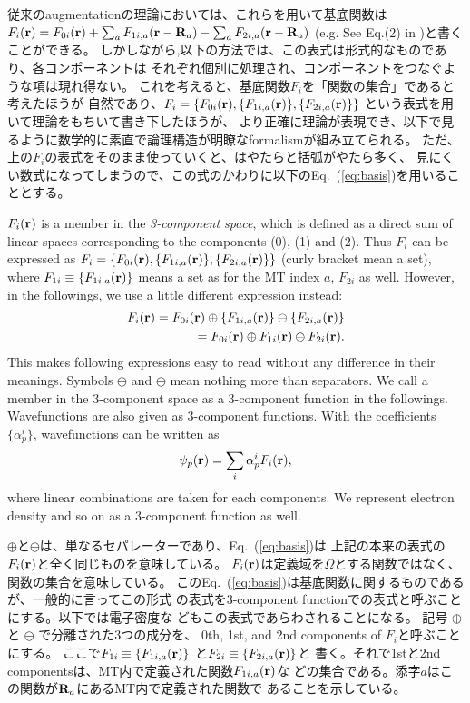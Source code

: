 \documentclass[twocolumn,showpacs,preprintnumbers,amsmath,amssymb,floatfix]{revtex4-1}
\newcommand{\bfr}{{\bf r}}
\newcommand{\bfR}{{\bf R}}
\newcommand{\ooplus}{\oplus}
\newcommand{\oominus}{\ominus}
\newcommand{\req}[1]{\mbox{Eq.~\!(\ref{#1})}}
\begin{document}
従来のaugmentationの理論においては、これらを用いて基底関数は
$F_i(\bfr) = F_{0i}(\bfr)+\sum_a F_{1i,a}(\bfr-\bfR_a)- \sum_a F_{2i,a}(\bfr-\bfR_a)$ 
(e.g. See Eq.(2) in \cite{kresse99})と書くことができる。
しかしながら,以下の方法では、この表式は形式的なものであり、各コンポーネントは
それぞれ個別に処理され、コンポーネントをつなぐような項は現れ得ない。
これを考えると、基底関数$F_i$を「関数の集合」であると考えたほうが
自然であり、$F_i=\{F_{0i}(\bfr),\{F_{1i,a}(\bfr)\},\{F_{2i,a}(\bfr)\} \}$
という表式を用いて理論をもちいて書き下したほうが、
より正確に理論が表現でき、以下で見るように数学的に素直で論理構造が明瞭なformalismが組み立てられる。
ただ、上の$F_i$の表式をそのまま使っていくと、はやたらと括弧がやたら多く、
見にくい数式になってしまうので、この式のかわりに以下の\req{eq:basis}を用いることとする。

$F_{i}(\bfr)$ is a member in the {\it 3-component space}, which
is defined as a direct sum of linear spaces
corresponding to the components (0), (1) and (2). Thus $F_i$ can be expressed as
$F_i=\{F_{0i}(\bfr),\{F_{1i,a}(\bfr)\},\{F_{2i,a}(\bfr)\} \}$
(curly bracket mean a set), where $F_{1i}\equiv \{F_{1i,a}(\bfr)\}$
means a set as for the MT index $a$, $F_{2i}$ as well. However, in the followings, we use a
little different expression instead:
\begin{eqnarray}
F_i(\bfr) = F_{0i}(\bfr) \ooplus \{ F_{1i,a}(\bfr)\} \oominus \{F_{2i,a}(\bfr)\}\nonumber\\
= F_{0i}(\bfr) \ooplus F_{1i}(\bfr)\oominus F_{2i}(\bfr).
\label{eq:basis}
\end{eqnarray}
This makes following expressions easy to read without any difference
in their meanings. Symbols $\ooplus$ and $\oominus$ mean nothing more
than separators.
We call a member in the 3-component space as a 3-component function in
the followings.
Wavefunctions are also given as 3-component functions.
With the coefficients $\{\alpha_{p}^i\}$, wavefunctions can be written as
\begin{eqnarray}
\psi_p(\bfr) = \sum_i \alpha_p^i F_i(\bfr),
\label{eq:eig}
\end{eqnarray}
where linear combinations are taken for each components.
We represent electron density and so on as a 3-component function as well.

$\oplus$と$\ominus$は、単なるセパレーターであり、\req{eq:basis}は
上記の本来の表式の$F_i(\bfr)$と全く同じものを意味している。
$F_i(\bfr)$は定義域を$\Omega$とする関数ではなく、
関数の集合を意味している。
この\req{eq:basis}は基底関数に関するものであるが、一般的に言ってこの形式
の表式を3-component functionでの表式と呼ぶことにする。以下では電子密度な
どもこの表式であらわされることになる。
記号 $\oplus$ と $\ominus$ で分離された3つの成分を、
0th, 1st, and 2nd components of $F_i$と呼ぶことにする。
ここで$F_{1i}\equiv\{ F_{1i,a}(\bfr)\}$ と$F_{2i}\equiv\{ F_{2i,a}(\bfr)\}$と
書く。それで1stと2nd componentsは、MT内で定義された関数$F_{1i,a}(\bfr)$な
どの集合である。添字$a$はこの関数が$\bfR_a$にあるMT内で定義された関数で
あることを示している。
\end{document}
